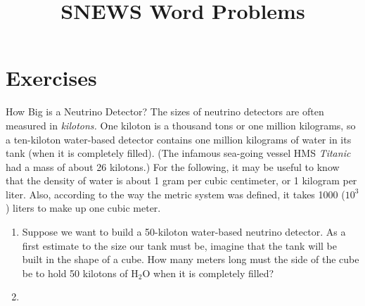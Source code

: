 \documentclass[12pt]{article}
\begin{document}
\title{SNEWS Word Problems}
\author{}
\date{}
\maketitle

\section{Exercises}

\begin{probdesc}{1}{How Big is a Neutrino Detector?}
The sizes of neutrino detectors are often measured in {\em kilotons.}
One kiloton is a thousand tons or one million kilograms, so a
ten-kiloton water-based detector contains one million kilograms of
water in its tank (when it is completely filled).  (The infamous
sea-going vessel HMS {\em Titanic} had a mass of about 26 kilotons.)
For the following, it may be useful to know that the density of water
is about 1 gram per cubic centimeter, or 1 kilogram per liter.  Also,
according to the way the metric system was defined, it takes 1000
($10^3$) liters to make up one cubic meter.

\begin{enumerate}
\item[(a)] Suppose we want to build a 50-kiloton water-based neutrino
  detector.  As a first estimate to the size our tank must be, imagine
  that the tank will be built in the shape of a cube.  How many meters
  long must the side of the cube be to hold 50 kilotons of H$_2$O when
  it is completely filled?

\item[(b)]
\end{enumerate}

\end{probdesc}
\end{document}
